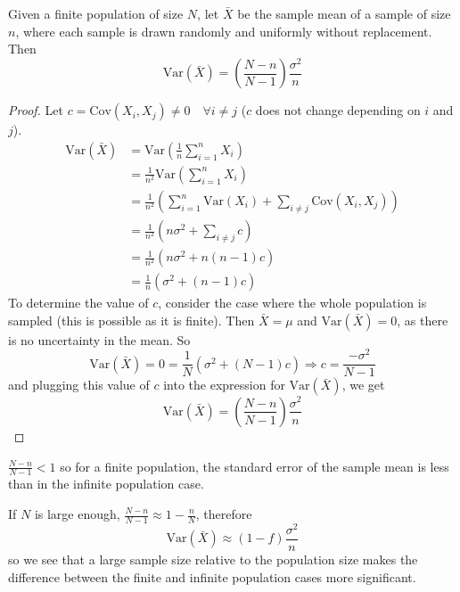 \begin{theorem}
	Given a finite population of size $N$, let $\bar{X}$ be the sample mean of a sample of size $n$, where each sample is drawn randomly and uniformly without replacement. Then
	\[
		\text{Var}(\bar{X}) = \left( \frac{N - n}{N - 1} \right) \frac{\sigma^2}{n}
	\]
\end{theorem}

\begin{proof}
	Let $c = \text{Cov}(X_i, X_j) \ne 0 \quad \forall i \ne j$ ($c$ does not change depending on $i$ and $j$).
	\[
		\begin{aligned}
			\text{Var}(\bar{X})
				& = \text{Var} \left( \frac{1}{n} \sum_{i = 1}^{n} X_i \right) \\
				& = \frac{1}{n^2} \text{Var} \left( \sum_{i = 1}^{n} X_i \right) \\
				& = \frac{1}{n^2} \left( \sum_{i = 1}^{n} \text{Var}(X_i) + \sum_{i \ne j} \text{Cov}(X_i, X_j) \right) \\
				& = \frac{1}{n^2} \left( n \sigma^2 + \sum_{i \ne j} c \right) \\
				& = \frac{1}{n^2} \left( n \sigma^2 + n(n - 1)c \right) \\
				& = \frac{1}{n} \left( \sigma^2 + (n - 1)c \right)
		\end{aligned}
	\]
	To determine the value of $c$, consider the case where the whole population is sampled (this is possible as it is finite). Then $\bar{X} = \mu$ and $\text{Var}(\bar{X}) = 0$, as there is no uncertainty in the mean. So
	\[
		\text{Var}(\bar{X}) = 0 = \frac{1}{N} (\sigma^2 + (N - 1)c) \Longrightarrow c = \frac{-\sigma^2}{N - 1}
	\]
	and plugging this value of $c$ into the expression for $\text{Var}(\bar{X})$, we get
	\[
		\text{Var}(\bar{X}) = \left( \frac{N - n}{N - 1} \right) \frac{\sigma^2}{n}
	\]
\end{proof}

\begin{remark}
	$\frac{N - n}{N - 1} < 1$ so for a finite population, the standard error of the sample mean is less than in the infinite population case.
\end{remark}

\begin{remark}
	If $N$ is large enough, $\frac{N - n}{N - 1} \approx 1 - \frac{n}{N}$, therefore
	\[
		\text{Var}(\bar{X}) \approx (1 - f) \frac{\sigma^2}{n}
	\]
	so we see that a large sample size relative to the population size makes the difference between the finite and infinite population cases more significant.
\end{remark}

